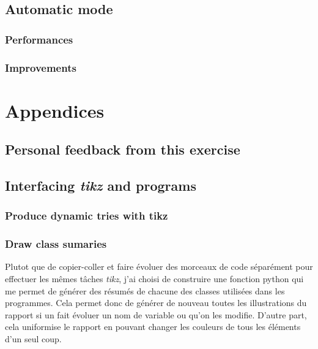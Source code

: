 \documentclass[10pt,a4paper,hidelinks]{article}
\begin{document}
\subsection{Automatic mode}
\subsubsection{Performances}
\subsubsection{Improvements}


\section{Appendices}
\subsection{Personal feedback from this exercise}
\subsection{Interfacing \textit{tikz} and programs}
\subsubsection{Produce dynamic tries with tikz}

\subsubsection{Draw class sumaries}
Plutot que de copier-coller et faire évoluer des morceaux de code séparément pour effectuer les mêmes tâches \textit{tikz}, j'ai choisi de construire une fonction python qui me permet de générer des résumés de chacune des classes utilisées dans les programmes. Cela permet donc de générer de nouveau toutes les illustrations du rapport si un fait évoluer un nom de variable ou qu'on les modifie. D'autre part, cela uniformise le rapport en pouvant changer les couleurs de tous les éléments d'un seul coup.
\end{document}
